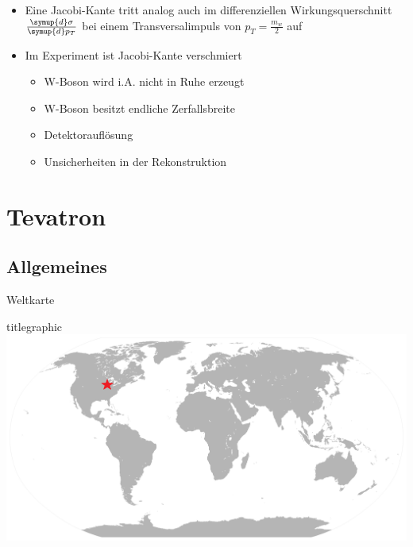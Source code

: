 \documentclass[aspectratio=1610, 9pt]{beamer}
\begin{document}
\begin{frame}
  \begin{itemize}
    \item Eine Jacobi-Kante tritt analog auch im differenziellen Wirkungsquerschnitt $\frac{\symup{d} \sigma}{\symup{d} p_T}$ bei einem Transversalimpuls von $p_T = \frac{m_w}{2}$ auf
    \item Im Experiment ist Jacobi-Kante verschmiert
    \begin{itemize}
      \item[\rightarrow] W-Boson wird i.A. nicht in Ruhe erzeugt
      \item[\rightarrow] W-Boson besitzt endliche Zerfallsbreite
      \item[\rightarrow] Detektorauflösung
      \item[\rightarrow] Unsicherheiten in der Rekonstruktion
    \end{itemize}
  \end{itemize}
\end{frame}

\section{Tevatron}

\subsection{Allgemeines}

\begin{frame}{Weltkarte}
  \begin{beamercolorbox}[center, wd=\textwidth]{titlegraphic}
    \includegraphics[width=\textwidth]{images/map.png}
  \end{beamercolorbox}%
\end{frame}
\end{document}
